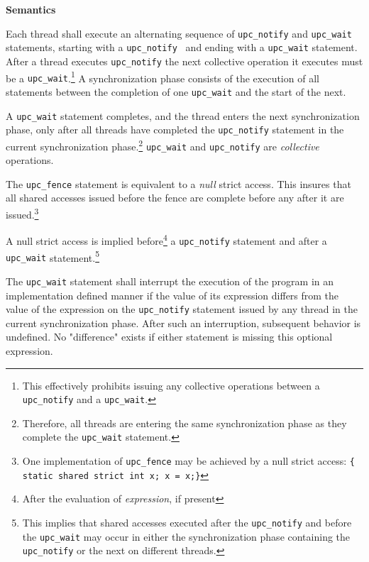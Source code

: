 {\bf Semantics} 


\np Each thread shall execute an alternating sequence of
     {\tt upc\_notify} and {\tt upc\_wait} statements, starting with a
     {\tt upc\_notify } and ending with a {\tt upc\_wait} statement.   After a
     thread executes {\tt upc\_notify} the next collective operation it executes
     must be a {\tt upc\_wait}.\footnote{This effectively prohibits issuing any
     collective operations between a {\tt upc\_notify} and  a {\tt upc\_wait}.}
     A synchronization phase consists of the execution of all statements
     between the completion of one {\tt upc\_wait} and the start of
     the next.

\np A {\tt upc\_wait} statement completes, and the
     thread enters the next synchronization phase, only after all
     threads have completed the {\tt upc\_notify} statement in the
     current synchronization phase.\footnote{Therefore,
     all threads are entering the same synchronization phase as they
     complete the {\tt upc\_wait} statement.}  {\tt upc\_wait}
     and {\tt upc\_notify} are {\em collective} operations.

\np The {\tt upc\_fence} statement is equivalent to a {\em
    null} strict access.  This insures that all shared accesses
    issued before the fence are complete before any after it are
    issued.\footnote{One implementation of {\tt upc\_fence} 
    may be achieved by a null strict access:
     {\tt  \{ static shared strict int x; x = x;\}}} 

\np A null strict access is implied before\footnote{After the evaluation 
    of {\em expression}, if present} a {\tt upc\_notify} statement and 
    after a {\tt upc\_wait} 
    statement.\footnote{This implies that shared accesses executed 
    after the {\tt upc\_notify} and before the {\tt upc\_wait} may occur in 
    either the synchronization phase containing the {\tt upc\_notify} or 
    the next on different threads.}

\np The {\tt upc\_wait} statement shall interrupt the execution of
    the program in an implementation defined manner
    if the value of its expression differs from the value of
    the expression on the {\tt upc\_notify} statement issued by any
    thread in the current
    synchronization phase.  After such an interruption, subsequent behavior
    is undefined. No "difference" exists if either statement is missing
    this optional expression.

